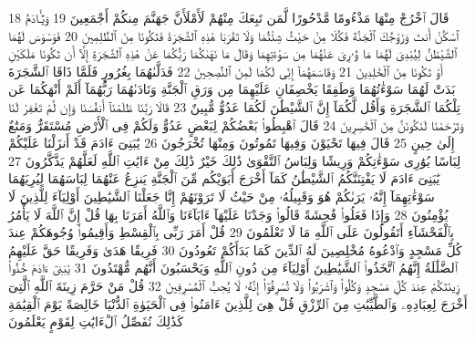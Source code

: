 {\tiny\colorbox{cl_aya}{18}} قَالَ ٱخْرُجْ مِنْهَا مَذْءُومًا مَّدْحُورًا لَّمَن تَبِعَكَ مِنْهُمْ لَأَمْلَأَنَّ جَهَنَّمَ مِنكُمْ أَجْمَعِينَ
{\tiny\colorbox{cl_aya}{19}} وَيَٰٓـَٔادَمُ ٱسْكُنْ أَنتَ وَزَوْجُكَ ٱلْجَنَّةَ فَكُلَا مِنْ حَيْثُ شِئْتُمَا وَلَا تَقْرَبَا هَٰذِهِ ٱلشَّجَرَةَ فَتَكُونَا مِنَ ٱلظَّٰلِمِينَ
{\tiny\colorbox{cl_aya}{20}} فَوَسْوَسَ لَهُمَا ٱلشَّيْطَٰنُ لِيُبْدِىَ لَهُمَا مَا وُۥرِىَ عَنْهُمَا مِن سَوْءَٰتِهِمَا وَقَالَ مَا نَهَىٰكُمَا رَبُّكُمَا عَنْ هَٰذِهِ ٱلشَّجَرَةِ إِلَّآ أَن تَكُونَا مَلَكَيْنِ أَوْ تَكُونَا مِنَ ٱلْخَٰلِدِينَ
{\tiny\colorbox{cl_aya}{21}} وَقَاسَمَهُمَآ إِنِّى لَكُمَا لَمِنَ ٱلنَّٰصِحِينَ
{\tiny\colorbox{cl_aya}{22}} فَدَلَّىٰهُمَا بِغُرُورٍ فَلَمَّا ذَاقَا ٱلشَّجَرَةَ بَدَتْ لَهُمَا سَوْءَٰتُهُمَا وَطَفِقَا يَخْصِفَانِ عَلَيْهِمَا مِن وَرَقِ ٱلْجَنَّةِ وَنَادَىٰهُمَا رَبُّهُمَآ أَلَمْ أَنْهَكُمَا عَن تِلْكُمَا ٱلشَّجَرَةِ وَأَقُل لَّكُمَآ إِنَّ ٱلشَّيْطَٰنَ لَكُمَا عَدُوٌّ مُّبِينٌ
{\tiny\colorbox{cl_aya}{23}} قَالَا رَبَّنَا ظَلَمْنَآ أَنفُسَنَا وَإِن لَّمْ تَغْفِرْ لَنَا وَتَرْحَمْنَا لَنَكُونَنَّ مِنَ ٱلْخَٰسِرِينَ
{\tiny\colorbox{cl_aya}{24}} قَالَ ٱهْبِطُوا۟ بَعْضُكُمْ لِبَعْضٍ عَدُوٌّ وَلَكُمْ فِى ٱلْأَرْضِ مُسْتَقَرٌّ وَمَتَٰعٌ إِلَىٰ حِينٍ
{\tiny\colorbox{cl_aya}{25}} قَالَ فِيهَا تَحْيَوْنَ وَفِيهَا تَمُوتُونَ وَمِنْهَا تُخْرَجُونَ
{\tiny\colorbox{cl_aya}{26}} يَٰبَنِىٓ ءَادَمَ قَدْ أَنزَلْنَا عَلَيْكُمْ لِبَاسًا يُوَٰرِى سَوْءَٰتِكُمْ وَرِيشًا وَلِبَاسُ ٱلتَّقْوَىٰ ذَٰلِكَ خَيْرٌ ذَٰلِكَ مِنْ ءَايَٰتِ ٱللَّهِ لَعَلَّهُمْ يَذَّكَّرُونَ
{\tiny\colorbox{cl_aya}{27}} يَٰبَنِىٓ ءَادَمَ لَا يَفْتِنَنَّكُمُ ٱلشَّيْطَٰنُ كَمَآ أَخْرَجَ أَبَوَيْكُم مِّنَ ٱلْجَنَّةِ يَنزِعُ عَنْهُمَا لِبَاسَهُمَا لِيُرِيَهُمَا سَوْءَٰتِهِمَآ إِنَّهُۥ يَرَىٰكُمْ هُوَ وَقَبِيلُهُۥ مِنْ حَيْثُ لَا تَرَوْنَهُمْ إِنَّا جَعَلْنَا ٱلشَّيَٰطِينَ أَوْلِيَآءَ لِلَّذِينَ لَا يُؤْمِنُونَ
{\tiny\colorbox{cl_aya}{28}} وَإِذَا فَعَلُوا۟ فَٰحِشَةً قَالُوا۟ وَجَدْنَا عَلَيْهَآ ءَابَآءَنَا وَٱللَّهُ أَمَرَنَا بِهَا قُلْ إِنَّ ٱللَّهَ لَا يَأْمُرُ بِٱلْفَحْشَآءِ أَتَقُولُونَ عَلَى ٱللَّهِ مَا لَا تَعْلَمُونَ
{\tiny\colorbox{cl_aya}{29}} قُلْ أَمَرَ رَبِّى بِٱلْقِسْطِ وَأَقِيمُوا۟ وُجُوهَكُمْ عِندَ كُلِّ مَسْجِدٍ وَٱدْعُوهُ مُخْلِصِينَ لَهُ ٱلدِّينَ كَمَا بَدَأَكُمْ تَعُودُونَ
{\tiny\colorbox{cl_aya}{30}} فَرِيقًا هَدَىٰ وَفَرِيقًا حَقَّ عَلَيْهِمُ ٱلضَّلَٰلَةُ إِنَّهُمُ ٱتَّخَذُوا۟ ٱلشَّيَٰطِينَ أَوْلِيَآءَ مِن دُونِ ٱللَّهِ وَيَحْسَبُونَ أَنَّهُم مُّهْتَدُونَ
{\tiny\colorbox{cl_aya}{31}} يَٰبَنِىٓ ءَادَمَ خُذُوا۟ زِينَتَكُمْ عِندَ كُلِّ مَسْجِدٍ وَكُلُوا۟ وَٱشْرَبُوا۟ وَلَا تُسْرِفُوٓا۟ إِنَّهُۥ لَا يُحِبُّ ٱلْمُسْرِفِينَ
{\tiny\colorbox{cl_aya}{32}} قُلْ مَنْ حَرَّمَ زِينَةَ ٱللَّهِ ٱلَّتِىٓ أَخْرَجَ لِعِبَادِهِۦ وَٱلطَّيِّبَٰتِ مِنَ ٱلرِّزْقِ قُلْ هِىَ لِلَّذِينَ ءَامَنُوا۟ فِى ٱلْحَيَوٰةِ ٱلدُّنْيَا خَالِصَةً يَوْمَ ٱلْقِيَٰمَةِ كَذَٰلِكَ نُفَصِّلُ ٱلْءَايَٰتِ لِقَوْمٍ يَعْلَمُونَ
